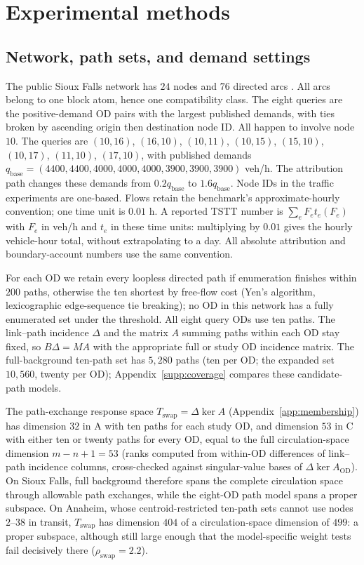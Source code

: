 \section{Experimental methods}\label{supp:fields}\label{supp:metrics}
\subsection{Network, path sets, and demand settings}\label{supp:networks}
The public Sioux Falls network has $24$ nodes and $76$ directed arcs
\citep{tnfrc2024transportation}. All arcs belong to one block atom, hence
one compatibility class. The eight queries are the positive-demand OD pairs with the largest
published demands, with ties broken by ascending origin then destination
node ID. All happen to involve node $10$.
The queries are
$(10,16)$, $(16,10)$, $(10,11)$, $(10,15)$, $(15,10)$, $(10,17)$, $(11,10)$, $(17,10)$,
with published demands
$q_{\mathrm{base}}=(4400,4400,4000,4000,4000,3900,3900,3900)$ veh/h.
The attribution path changes these demands from $0.2q_{\mathrm{base}}$ to
$1.6q_{\mathrm{base}}$. Node IDs in the traffic experiments are one-based.
Flows retain the benchmark's approximate-hourly convention; one time unit
is $0.01$ h. A reported TSTT number is $\sum_e F_et_e(F_e)$ with $F_e$
in veh/h and $t_e$ in these time units: multiplying by $0.01$ gives the
hourly vehicle-hour total, without extrapolating to a day. All absolute
attribution and boundary-account numbers use the same convention.

For each OD we retain every loopless directed path if enumeration finishes
within $200$ paths, otherwise the ten shortest by free-flow cost (Yen's
algorithm, lexicographic edge-sequence tie breaking); no OD in this
network has a fully enumerated set under the threshold. All eight query
ODs use ten paths. The link--path incidence $\Delta$ and the matrix $A$
summing paths within each OD stay fixed, so $B\Delta=MA$ with the
appropriate full or study OD incidence matrix. The full-background
ten-path set has $5{,}280$ paths (ten per OD; the expanded set
$10{,}560$, twenty per OD); Appendix~\ref{supp:coverage} compares these
candidate-path models.

The path-exchange response space $T_{\mathrm{swap}}=\Delta\ker A$
(Appendix~\ref{app:membership}) has dimension $32$ in A with ten
paths for each study OD, and dimension $53$ in C with either ten or
twenty paths for every OD, equal to the full circulation-space
dimension $m-n+1=53$ (ranks computed from within-OD differences of
link--path incidence columns, cross-checked against singular-value
bases of $\Delta\ker A_{\mathrm{OD}}$). On Sioux Falls, full background
therefore spans the complete circulation space through allowable path
exchanges, while the eight-OD path model spans a proper subspace. On Anaheim, whose
centroid-restricted ten-path sets cannot use nodes $2$--$38$ in
transit, $T_{\mathrm{swap}}$ has dimension $404$ of a circulation-space
dimension of $499$: a proper subspace, although still large enough
that the model-specific weight tests fail decisively there
($\rho_{\mathrm{swap}}=2.2$).

